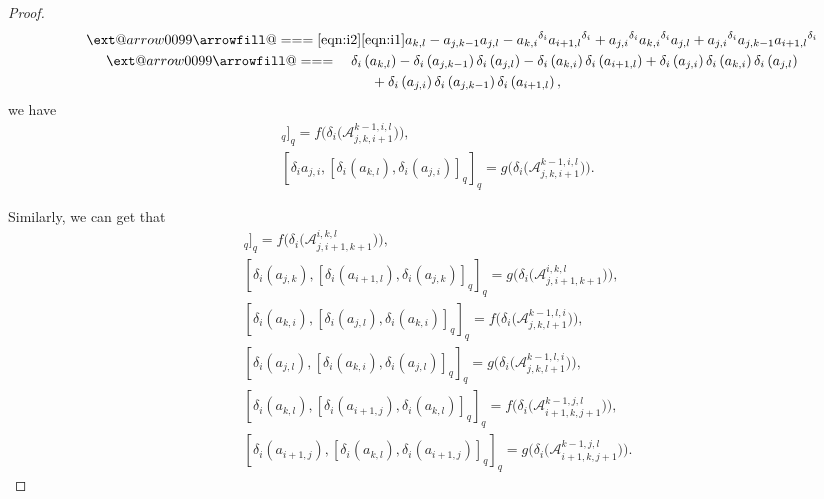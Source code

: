 \documentclass[10pt,a4paper]{amsart}
\makeatletter
\def\x@arrow{\DOTSB\Relbar}
\def\xlongequalsignfill@{\arrowfill@\x@arrow\Relbar\x@arrow}
\providecommand{\xlongequal}[2][]{%
	\ext@arrow 0099\xlongequalsignfill@{#1}{#2}}
\numberwithin{equation}{section}
\def\lr#1{\left[#1\right]}
\def\lrb#1{\left(#1\right)}
\def\d{\delta}
\def\A{\mathscr{A}}
\makeatother
\begin{document}
\begin{proof}
\begin{gather*}
 \qquad\xlongequal[\eqref{eqn:i2}]{\eqref{eqn:i1}} a_{k,l}-a_{j,k-1}a_{j,l} -{a_{k,i}}^{\d_i}{a_{i+1,l}}^{\d_i} +{a_{j,i}}^{\d_i}{a_{k,i}}^{\d_i}a_{j,l} +{a_{j,i}}^{\d_i}a_{j,k-1}{a_{i+1,l}}^{\d_i}\\
\qquad \xlongequal{\quad} \d_i \lrb{a_{k,l} } -\d_i \lrb{a_{j,k-1}}\d_i\lrb{a_{j,l}} -\d_i\lrb{a_{k,i}}\d_i\lrb{a_{i+1,l}} +\d_i\lrb{a_{j,i}}\d_i\lrb{a_{k,i}}\d_i\lrb{a_{j,l}}\\
\qquad\qquad{}+\d_i\lrb{a_{j,i}}\d_i\lrb{a_{j,k-1}}\d_i\lrb{a_{i+1,l}},
\end{gather*}
we have
\begin{gather*}
[\d_i\lrb{a_{k, l}},\lr{\d_i\lrb{a_{j, i}}, \d_i\lrb{a_{k, l}}}_q]_q
=f\bigl(\d_i\bigl(\A_{j,k,i+1}^{k-1,i,l}\bigr)\bigr), \\
[\d_i{a_{j,i}},\lr{\d_i\lrb{a_{k,l}}, \d_i\lrb{a_{j,i}}}_q]_q
= g\bigl(\d_i\bigl(\A_{j,k,i+1}^{k-1,i,l}\bigr)\bigr).
\end{gather*}

Similarly, we can get that
\begin{gather*}
[\d_i\lrb{a_{i+1, l}},\lr{\d_i\lrb{a_{j, k}},\d_i\lrb{a_{i+1, l}}}_q]_q
=f\bigl(\d_i\bigl(\A_{j,i+1,k+1}^{i,k,l}\bigr)\bigr), \\
[\d_i\lrb{a_{j,k}},\lr{\d_i\lrb{a_{i+1,l}},\d_i\lrb{a_{j,k}}}_q]_q
= g\bigl(\d_i\bigl(\A_{j,i+1,k+1}^{i,k,l}\bigr)\bigr),\\
[\d_i\lrb{a_{k,i}},\lr{\d_i\lrb{a_{j,l}},\d_i\lrb{a_{k,i}}}_q]_q
=f\bigl(\d_i\bigl(\A_{j,k,l+1}^{k-1,l,i}\bigr)\bigr), \\
[\d_i\lrb{a_{j, l}},\lr{\d_i\lrb{a_{k, i}},\d_i\lrb{a_{j, l}}}_q]_q
= g\bigl(\d_i\bigl(\A_{j,k,l+1}^{k-1,l,i}\bigr)\bigr),\\
[\d_i\lrb{a_{k, l}},\lr{\d_i\lrb{a_{i+1, j}},\d_i\lrb{a_{k, l}}}_q]_q
=f\bigl(\d_i\bigl(\A_{i+1,k,j+1}^{k-1,j,l}\bigr)\bigr), \\
[\d_i\lrb{a_{i+1,j}},\lr{\d_i\lrb{a_{k,l}},\d_i\lrb{a_{i+1,j}}}_q]_q
= g\bigl(\d_i\bigl(\A_{i+1,k,j+1}^{k-1,j,l}\bigr)\bigr).
\end{gather*}


\end{proof}
\end{document}
